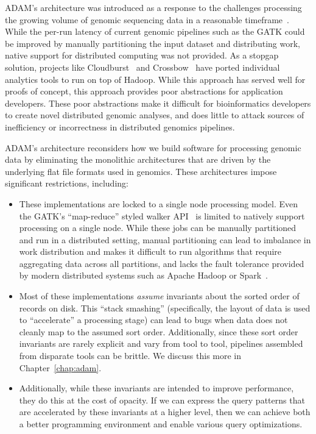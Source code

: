 \documentclass[phd]{ucbthesis}
\begin{document}
{ADAM}'s architecture was introduced as a response to the challenges
processing the growing volume of genomic sequencing data in a reasonable
timeframe~\cite{schadt10, stein10}. While the per-run latency of current genomic
pipelines such as the {GATK} could be improved by manually partitioning
the input dataset and distributing work, native support for distributed
computing was not provided. As a stopgap solution, projects like
{Cloudburst}~\cite{schatz09} and {Crossbow}~\cite{langmead09crossbow}
have ported individual analytics tools to run on top of {Hadoop}. While
this approach has served well for proofs of concept, this approach provides poor
abstractions for application developers. These poor abstractions make it
difficult for bioinformatics developers to create novel distributed genomic
analyses, and does little to attack sources of inefficiency or incorrectness in
distributed genomics pipelines.

{ADAM}'s architecture reconsiders how we build software for processing
genomic data by eliminating the monolithic architectures that are driven by the
underlying flat file formats used in genomics. These architectures impose
significant restrictions, including:

\begin{itemize}
\item These implementations are locked to a single node processing model. Even
  the {GATK}'s ``map-reduce'' styled {walker} API~\cite{mckenna10}
  is limited to natively support processing on a single node. While these jobs
  can be manually partitioned and run in a distributed setting, manual
  partitioning can lead to imbalance in work distribution and makes it difficult
  to run algorithms that require aggregating data across all partitions, and
  lacks the fault tolerance provided by modern distributed systems such as
  {Apache Hadoop} or {Spark}~\cite{zaharia12}.
\item Most of these implementations \emph{assume} invariants about the sorted
  order of records on disk. This ``stack smashing'' (specifically, the layout
  of data is used to ``accelerate'' a processing stage) can lead to bugs when
  data does not cleanly map to the assumed sort order. Additionally, since these
  sort order invariants are rarely explicit and vary from tool to tool,
  pipelines assembled from disparate tools can be brittle. We discuss this more
  in Chapter~\ref{chap:adam}.
\item Additionally, while these invariants are intended to improve performance,
  they do this at the cost of opacity. If we can express the query patterns that
  are accelerated by these invariants at a higher level, then we can achieve
  both a better programming environment and enable various query optimizations.
\end{itemize}
\end{document}
